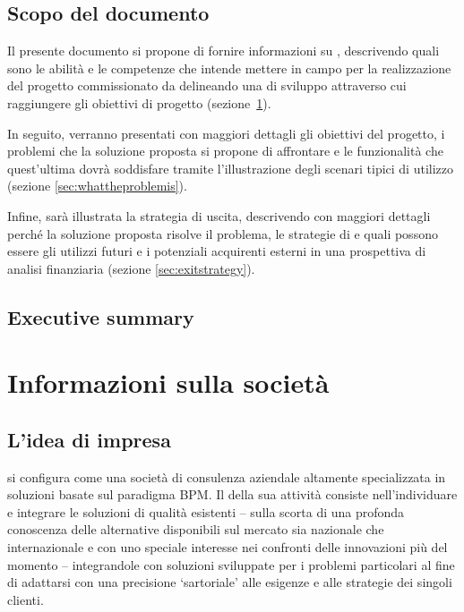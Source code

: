 \subsection{Scopo del documento}
Il presente documento si propone di fornire informazioni su \team, descrivendo quali sono le abilità e le competenze che intende mettere in campo per la realizzazione del progetto commissionato da \customer delineando una  di sviluppo attraverso cui raggiungere gli obiettivi di progetto (sezione~\ref{sec:whoweare}).

In seguito, verranno presentati con maggiori dettagli gli obiettivi del progetto, i problemi che la soluzione proposta si propone di affrontare e le funzionalità che quest'ultima dovrà soddisfare tramite l'illustrazione degli scenari tipici di utilizzo (sezione \ref{sec:whattheproblemis}).
 
Infine, sarà illustrata la strategia di uscita, descrivendo con maggiori dettagli perché la soluzione proposta risolve il problema, le strategie di \mktg e quali possono essere gli utilizzi futuri e i potenziali acquirenti esterni in una prospettiva di analisi finanziaria (sezione \ref{sec:exitstrategy}).

\subsection{Executive summary}



\clearpage

\section{Informazioni sulla società}\label{sec:whoweare}

\subsection{L'idea di impresa}
\team si configura come una società di consulenza aziendale altamente specializzata in soluzioni basate sul paradigma BPM\@. Il  della sua attività consiste nell'individuare e integrare le soluzioni di qualità esistenti -- sulla scorta di una profonda conoscenza delle alternative disponibili sul mercato sia nazionale che internazionale e con uno speciale interesse nei confronti delle innovazioni più  del momento -- integrandole con  soluzioni sviluppate  per i problemi particolari al fine di adattarsi con una precisione `sartoriale' alle esigenze e alle strategie dei singoli clienti.

